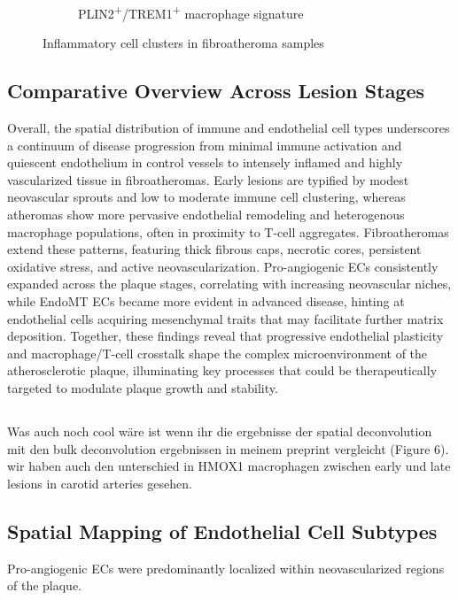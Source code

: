 \documentclass[a4paper,12pt]{article}
\begin{document}
\begin{figure}[H]
\begin{subfigure}{0.3\textwidth}
\caption{PLIN2\textsuperscript{+}/TREM1\textsuperscript{+} macrophage signature}
\label{fig:atherosclerosis_spatial}
\end{subfigure}
\caption{Inflammatory cell clusters in fibroatheroma samples}
\label{fig:spatial_deconvolution}
\end{figure}
\subsection{Comparative Overview Across Lesion Stages}
Overall, the spatial distribution of immune and endothelial cell types underscores a continuum of disease progression from minimal immune activation and quiescent endothelium in control vessels to intensely inflamed and highly vascularized tissue in fibroatheromas. Early lesions are typified by modest neovascular sprouts and low to moderate immune cell clustering, whereas atheromas show more pervasive endothelial remodeling and heterogenous macrophage populations, often in proximity to T-cell aggregates. Fibroatheromas extend these patterns, featuring thick fibrous caps, necrotic cores, persistent oxidative stress, and active neovascularization. Pro-angiogenic ECs consistently expanded across the plaque stages, correlating with increasing neovascular niches, while EndoMT ECs became more evident in advanced disease, hinting at endothelial cells acquiring mesenchymal traits that may facilitate further matrix deposition. Together, these findings reveal that progressive endothelial plasticity and macrophage/T-cell crosstalk shape the complex microenvironment of the atherosclerotic plaque, illuminating key processes that could be therapeutically targeted to modulate plaque growth and stability.

\subsection{}
Was auch noch cool wäre ist wenn ihr die ergebnisse der spatial deconvolution mit den bulk deconvolution ergebnissen in meinem preprint vergleicht (Figure 6). wir haben auch den unterschied in HMOX1 macrophagen zwischen early und late lesions in carotid arteries gesehen.


\subsection{Spatial Mapping of Endothelial Cell Subtypes}
Pro-angiogenic ECs were predominantly localized within neovascularized regions of the plaque.
\end{document}
